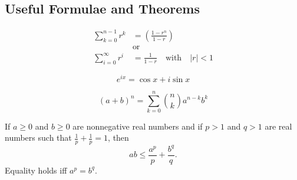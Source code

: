 \subsection*{Useful Formulae and Theorems}
\begin{align*}
    \tag{Geometric Series}
    \sum_{k = 0}^{n - 1} r^k    & = \left( \frac{1 - r^n}{1 - r} \right)                         \\
                                & \text{or}                                                      \\
    \sum_{i = 0}^{\infty} r^{i} & = \frac{1}{1 - r} \quad \text{with} \quad \left| r \right| < 1
    \label{eqn:geometric-series}
\end{align*}

\begin{equation*} \tag{Euler's formula}
    e^{i x}=\cos x+i \sin x
    \label{eqn:Euler}
\end{equation*}

\begin{equation*}
    \tag{Newton's Binomial formula}
    (a+b)^{n}=\sum_{k=0}^{n} \binom{n}{k} a^{n-k} b^{k}
    \label{eqn:nbf}
\end{equation*}

\begin{thm} \label{theorem: youngs}
    If $a \geq 0$ and $b \geq 0$ are nonnegative real numbers and if $p > 1$ and $q > 1$ are real numbers such that $\frac{1}{p} + \frac{1}{p} = 1$, then
    \[
        ab \leq \frac{a^p}{p} + \frac{b^q}{q}.
    \]
    Equality holds iff $a^p = b^q$.
\end{thm}